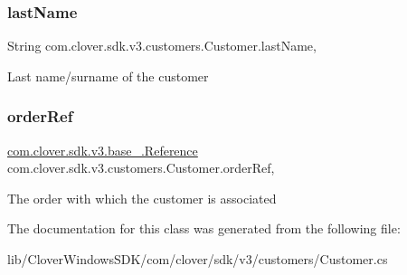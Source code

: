 \subsubsection{\texorpdfstring{last\+Name}{lastName}}
{\footnotesize\ttfamily String com.\+clover.\+sdk.\+v3.\+customers.\+Customer.\+last\+Name\hspace{0.3cm}{\ttfamily [get]}, {\ttfamily [set]}}



Last name/surname of the customer 

\mbox{\label{classcom_1_1clover_1_1sdk_1_1v3_1_1customers_1_1_customer_aba176d2a5bcfbcc4c80ade1c9e27274e}} 
\subsubsection{\texorpdfstring{order\+Ref}{orderRef}}
{\footnotesize\ttfamily \hyperlink{classcom_1_1clover_1_1sdk_1_1v3_1_1base___1_1_reference}{com.\+clover.\+sdk.\+v3.\+base\+\_\+.\+Reference} com.\+clover.\+sdk.\+v3.\+customers.\+Customer.\+order\+Ref\hspace{0.3cm}{\ttfamily [get]}, {\ttfamily [set]}}



The order with which the customer is associated 



The documentation for this class was generated from the following file\+:\begin{DoxyCompactItemize}
\item 
lib/\+Clover\+Windows\+S\+D\+K/com/clover/sdk/v3/customers/Customer.\+cs\end{DoxyCompactItemize}
